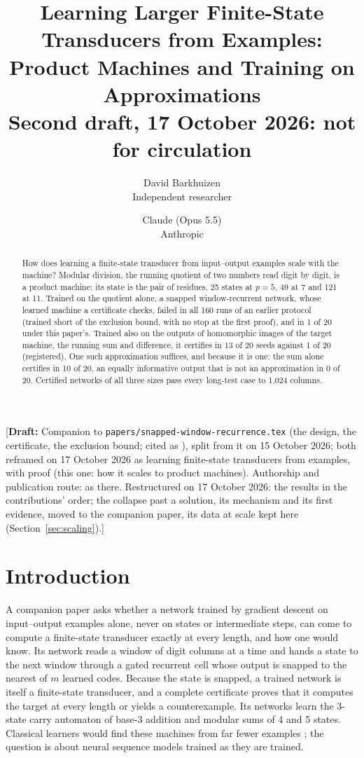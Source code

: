 \documentclass[11pt]{article}
\title{Learning Larger Finite-State Transducers from Examples:\\Product Machines and Training on
Approximations\\[0.5em]
\large Second draft, 17 October 2026: not for circulation}
\author{
  David Barkhuizen\\
  Independent researcher
  \and
  Claude (Opus 5.5)\\
  Anthropic
}
\date{}
\newcommand{\draftnote}[1]{\textcolor{red!70!black}{[\textbf{Draft:} #1]}}
\begin{document}
\maketitle

\draftnote{Companion to \texttt{papers/snapped-window-recurrence.tex} (the design, the certificate, the
exclusion bound; cited as \citep{barkhuizen-2026-snapped-window-recurrence}), split from it on 15
October 2026; both reframed on 17 October 2026 as learning finite-state transducers from examples,
with proof (this one: how it scales to product machines).
Authorship and publication route: as there. Restructured on 17 October 2026: the results in the
contributions' order; the collapse past a solution, its mechanism and its first evidence, moved to
the companion paper, its data at scale kept here (Section~\ref{sec:scaling}).}

\begin{abstract}
How does learning a finite-state transducer from input--output examples scale with the machine?
Modular division, the running quotient of two numbers read digit by digit, is a product machine:
its state is the pair of residues, 25 states at $p = 5$, 49 at 7 and 121 at 11. Trained on the
quotient alone, a snapped window-recurrent network, whose learned machine a certificate checks,
failed in all 160 runs of an earlier protocol (trained short of the exclusion bound, with no stop at
the first proof), and in 1 of 20 under this paper's. Trained also on the outputs of homomorphic images of the target machine, the running sum
and difference, it certifies in 13 of 20 seeds against 1 of 20 (registered). One such approximation
suffices, and because it is one: the sum alone certifies in 10 of 20, an equally informative output
that is not an approximation in 0 of 20. Certified networks of all three sizes pass every long-test case to
1{,}024 columns.
\end{abstract}

\section{Introduction}

A companion paper \citep{barkhuizen-2026-snapped-window-recurrence} asks whether a network trained
by gradient descent on input--output examples alone, never on states or intermediate steps, can
come to compute a finite-state transducer exactly at every length, and how one would know. Its
network reads a window of digit columns at a time and hands a state to the next window through a
gated recurrent cell whose output is snapped to the nearest of $m$ learned codes. Because the state
is snapped, a trained network is itself a finite-state transducer, and a complete certificate
proves that it computes the target at every length or yields a counterexample. Its networks learn
the 3-state carry automaton of base-3 addition and modular sums of 4 and 5 states. Classical
learners would find these machines from far fewer examples
\citep{oncina-1992-transducer-learning-pattern-recognition}; the question is about neural sequence
models trained as they are trained.
\end{document}
